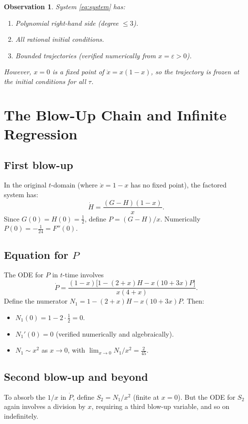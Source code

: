 \documentclass[11pt]{article}
\newtheorem{observation}{Observation}
\theoremstyle{definition}
\theoremstyle{remark}
\begin{document}
\begin{observation}
System \eqref{eq:system} has:
\begin{enumerate}
  \item Polynomial right-hand side (degree $\le 3$).
  \item All rational initial conditions.
  \item Bounded trajectories (verified numerically from $x=\varepsilon>0$).
\end{enumerate}
However, $x=0$ is a fixed point of $\dot{x} = x(1-x)$, so the trajectory is frozen at the initial conditions for all $\tau$.
\end{observation}

\section{The Blow-Up Chain and Infinite Regression}

\subsection{First blow-up}
In the original $t$-domain (where $\dot{x} = 1-x$ has no fixed point), the factored system has:
\[
  \dot{H} = \frac{(G-H)(1-x)}{x}.
\]
Since $G(0) = H(0) = \frac{1}{2}$, define $P = (G-H)/x$. Numerically $P(0) = -\frac{1}{24} = F''(0)$.

\subsection{Equation for $P$}
The ODE for $P$ in $t$-time involves
\[
  \dot{P} = \frac{(1-x)\bigl[1 - (2+x)H - x(10+3x)P\bigr]}{x(4+x)}.
\]
Define the numerator $N_1 = 1 - (2+x)H - x(10+3x)P$. Then:
\begin{itemize}
  \item $N_1(0) = 1 - 2 \cdot \frac{1}{2} = 0$.
  \item $N_1'(0) = 0$ (verified numerically and algebraically).
  \item $N_1 \sim x^2$ as $x \to 0$, with $\lim_{x\to 0} N_1/x^2 = \frac{2}{45}$.
\end{itemize}

\subsection{Second blow-up and beyond}
To absorb the $1/x$ in $\dot{P}$, define $S_2 = N_1/x^2$ (finite at $x=0$). But the ODE for $S_2$ again involves a division by $x$, requiring a third blow-up variable, and so on indefinitely.
\end{document}
